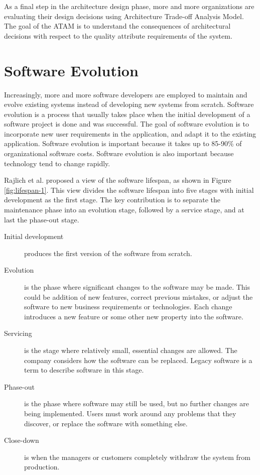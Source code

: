 As a final step in the architecture design phase, more and more organizations are evaluating their design decisions using Architecture Trade-off Analysis Model\cite{Bass:2012:SAP:2392670,sherman2008quality}. The goal of the ATAM is to understand the consequences of architectural decisions with respect to the quality attribute requirements of the system.







\section{Software Evolution}
\label{sec:2-SE}
Increasingly, more and more software developers are employed to maintain and evolve existing systems instead of developing new systems from scratch\cite{Sommerville:2011:SE}. Software evolution is a process that usually takes place when the initial development of a software project is done and was successful\cite{Bennett:2000:SME:336512.336534}. The goal of software evolution is to incorporate new user requirements in the application, and adapt it to the existing application. Software evolution is important because it takes up to 85-90\% of organizational software costs\cite{Sommerville:2011:SE}. Software evolution is also important because technology tend to change rapidly.

Rajlich et al.\cite{Bennett:2000:SME:336512.336534} proposed a view of the software lifespan, as shown in Figure \ref{fig:lifespan-1}. This view divides the software lifespan into five stages with initial development as the first stage. The key contribution is to separate the maintenance phase into an evolution stage, followed by a service stage, and at last the phase-out stage.
\begin{description}
	\item[Initial development] produces the first version of the software from scratch.
	\item[Evolution] is the phase where significant changes to the software may be made. This could be addition of new features, correct previous mistakes, or adjust the software to new business requirements or technologies. Each change introduces a new feature or some other new property into the software.
	\item[Servicing] is the stage where relatively small, essential changes are allowed. The company considers how the software can be replaced. Legacy software is a term to describe software in this stage.
	\item[Phase-out] is the phase where software may still be used, but no further changes are being implemented. Users must work around any problems that they discover, or replace the software with something else.
	\item[Close-down] is when the managers or customers completely withdraw the system from production.
\end{description} 

